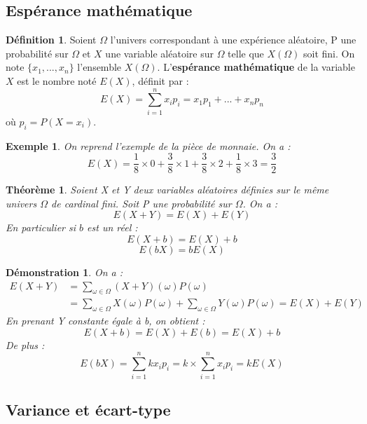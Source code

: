 \documentclass[a4paper,12pt,final]{article}
\newtheorem{Ex}{Exemple}[section]
\newtheorem{Proof}{Démonstration}[section]
\theoremstyle{theorem}
\newtheorem{Th}{Théorème}[section]
\theoremstyle{definition}
\theoremstyle{definition}
\theoremstyle{definition}
\newtheorem{Def}{Définition}[section]
\begin{document}
	\subsection{Espérance mathématique}
	
	\begin{Def}
		Soient $\Omega$ l'univers correspondant à une expérience aléatoire, P une probabilité sur $\Omega$ et $X$ une variable aléatoire sur $\Omega$ telle que $X(\Omega)$ soit fini. On note $\{x_{1},...,x_{n}\}$ l'ensemble $X(\Omega)$. L'\textbf{espérance mathématique} de la variable $X$ est le nombre noté $E(X)$, définit par :
		\[E(X) = \sum_{i=1}^{n} x_{i}p_{i} = x_{1}p_{1} + ... + x_{n}p_{n}\]
		où $p_{i} = P(X=x_{i})$.
	\end{Def}

	\begin{Ex}
		On reprend l'exemple de la pièce de monnaie. On a :
		\[E(X) = \frac{1}{8} \times 0 + \frac{3}{8} \times 1 + \frac{3}{8} \times 2 + \frac{1}{8} \times 3 = \frac{3}{2}\]
	\end{Ex}

	\begin{Th}
		Soient X et Y deux variables aléatoires définies sur le même univers $\Omega$ de cardinal fini. Soit P une probabilité sur $\Omega$. On a : 
		\[E(X+Y) = E(X) + E(Y)\]
		En particulier si $b$ est un réel :
		\[E(X + b) = E(X) + b\]
		\[E(bX) = bE(X)\]
	\end{Th}

	\begin{Proof}
		On a : 
		\[\begin{array}{ll}
			E(X+Y) & = \sum_{\omega \in \Omega} (X + Y)(\omega)P(\omega) \\
			& = \sum_{\omega \in \Omega} X(\omega)P(\omega) + \sum_{\omega \in \Omega} Y(\omega)P(\omega) = E(X) + E(Y)
		\end{array}\]
		En prenant Y constante égale à b, on obtient : 
		\[E(X + b) = E(X) + E(b) = E(X) + b\]
		De plus :
		\[E(bX) = \sum_{i=1}^{n} kx_{i}p_{i} = k \times \sum_{i=1}^{n} x_{i}p_{i} = kE(X)\]			
	\end{Proof}

	\subsection{Variance et écart-type}
	
\end{document}
